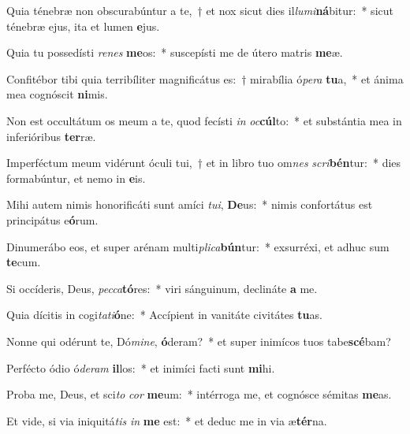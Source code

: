 \item Quia ténebræ non obscurabúntur a te,~† et nox sicut dies il\textit{lu}\textit{mi}\textbf{ná}bitur:~* sicut ténebræ ejus, ita et lumen \textbf{e}jus.
\item Quia tu possedísti \textit{re}\textit{nes} \textbf{me}os:~* suscepísti me de útero matris \textbf{me}æ.
\item Confitébor tibi quia terribíliter magnificátus es:~† mirabília ó\textit{pe}\textit{ra} \textbf{tu}a,~* et ánima mea cognóscit \textbf{ni}mis.
\item Non est occultátum os meum a te, quod fecísti \textit{in} \textit{oc}\textbf{cúl}to:~* et substántia mea in inferióribus \textbf{ter}ræ.
\item Imperféctum meum vidérunt óculi tui,~† et in libro tuo om\textit{nes} \textit{scri}\textbf{bén}tur:~* dies formabúntur, et nemo in \textbf{e}is.
\item Mihi autem nimis honorificáti sunt amíci \textit{tu}\textit{i}, \textbf{De}us:~* nimis confortátus est principátus e\textbf{ó}rum.
\item Dinumerábo eos, et super arénam multi\textit{pli}\textit{ca}\textbf{bún}tur:~* exsurréxi, et adhuc sum \textbf{te}cum.
\item Si occíderis, Deus, \textit{pec}\textit{ca}\textbf{tó}res:~* viri sánguinum, declináte \textbf{a} me.
\item Quia dícitis in cogi\textit{ta}\textit{ti}\textbf{ó}ne:~* Accípient in vanitáte civitátes \textbf{tu}as.
\item Nonne qui odérunt te, Dó\textit{mi}\textit{ne}, \textbf{ó}deram?~* et super inimícos tuos tabe\textbf{scé}bam?
\item Perfécto ódio ó\textit{de}\textit{ram} \textbf{il}los:~* et inimíci facti sunt \textbf{mi}hi.
\item Proba me, Deus, et sci\textit{to} \textit{cor} \textbf{me}um:~* intérroga me, et cognósce sémitas \textbf{me}as.
\item Et vide, si via iniquitá\textit{tis} \textit{in} \textbf{me} est:~* et deduc me in via æ\textbf{tér}na.
